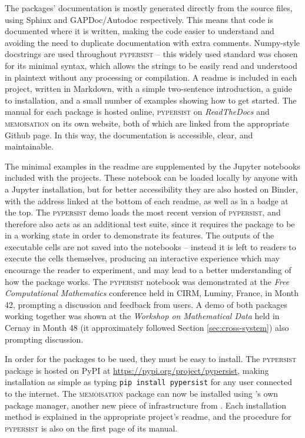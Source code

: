 \documentclass{deliverablereport}
\newcommand{\pypersist}{\textsc{pypersist}}
\newcommand{\Memoisation}{\textsc{memoisation}}
\begin{document}
The packages' documentation is mostly generated directly from the source files,
using Sphinx and GAPDoc/Autodoc respectively.
This means that code is documented where it is written,
making the code easier to understand and avoiding the need to duplicate
documentation with extra comments.  Numpy-style docstrings are used throughout \pypersist{}
-- this widely used standard was chosen for its minimal syntax, which allows the
strings to be easily read and understood in plaintext without any processing or
compilation.  A readme is included in each project, written in Markdown, with a simple
two-sentence introduction, a guide to installation, and a small number of examples
showing how to get started.  The manual for each package is hosted online,
\pypersist{} on \textit{ReadTheDocs} and \Memoisation{} on its own website, both
of which are linked from the appropriate Github page.  In this way, the
documentation is accessible, clear, and
maintainable.

The minimal examples in the readme are supplemented by the Jupyter notebooks
included with the projects.
These notebook can be loaded locally by anyone with a Jupyter installation, but
for better accessibility they are also hosted on Binder, with the address linked at
the bottom of each readme, as well as in a badge at the top.  The \pypersist{} demo loads the
most recent version of \pypersist{}, and therefore also acts as an additional
test suite, since it requires the package to be in a working state in order to
demonstrate its features.  The outputs of the executable cells are not saved
into the notebooks -- instead it is left to readers to execute the cells
themselves, producing an interactive experience which may encourage the reader to
experiment, and may lead to a better understanding of how the package works.
The \pypersist{} notebook was demonstrated at the \emph{Free Computational Mathematics}
conference held in CIRM, Luminy, France, in Month 42, prompting a
discussion and feedback from users.  A demo of both packages working together
was shown at the \textit{Workshop on Mathematical Data} held in Cernay
in Month 48 (it approximately followed Section \ref{sec:cross-system}) also
prompting discussion.

In order for the packages to be used, they must be easy to install.  The
\pypersist{} package is hosted on PyPI at
\url{https://pypi.org/project/pypersist}, making installation as simple as
typing \texttt{pip install pypersist} for any user connected to the internet.
The \Memoisation{} package can now be installed using \GAP's own package manager,
another new piece of \GAP infrastructure from \ODK.  Each installation method is
explained in the appropriate project's readme, and the procedure for
\pypersist{} is also on the first page of its manual.
\end{document}
